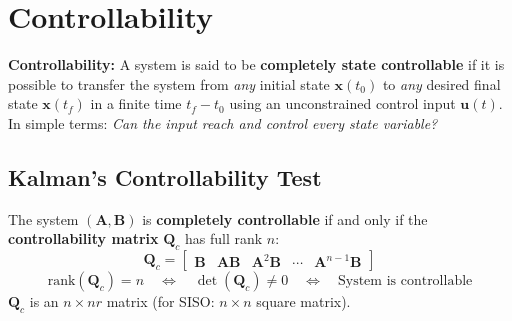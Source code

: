 \documentclass[12pt,a4paper]{article}
\begin{document}
\section{Controllability}

\begin{tcolorbox}[defbox]
\textbf{Controllability:} A system is said to be \textbf{completely state controllable} if it is possible to transfer the system from \textit{any} initial state $\mathbf{x}(t_0)$ to \textit{any} desired final state $\mathbf{x}(t_f)$ in a finite time $t_f - t_0$ using an unconstrained control input $\mathbf{u}(t)$.\\[4pt]
In simple terms: \textit{Can the input reach and control every state variable?}
\end{tcolorbox}

\subsection{Kalman's Controllability Test}

\begin{tcolorbox}[formulabox, title={Controllability Matrix}]
The system $(\mathbf{A}, \mathbf{B})$ is \textbf{completely controllable} if and only if the \textbf{controllability matrix} $\mathbf{Q}_c$ has full rank $n$:
$$\mathbf{Q}_c = \begin{bmatrix}\mathbf{B} & \mathbf{A}\mathbf{B} & \mathbf{A}^2\mathbf{B} & \cdots & \mathbf{A}^{n-1}\mathbf{B}\end{bmatrix}$$
$$\text{rank}(\mathbf{Q}_c) = n \quad \Leftrightarrow \quad \det(\mathbf{Q}_c) \neq 0 \quad \Leftrightarrow \quad \text{System is controllable}$$
$\mathbf{Q}_c$ is an $n \times nr$ matrix (for SISO: $n \times n$ square matrix).
\end{tcolorbox}
\end{document}
